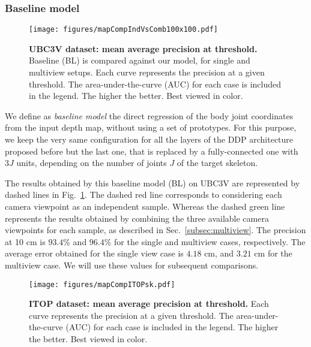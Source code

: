 \documentclass[review,12pt,3p]{elsarticle}
\begin{document}
\subsubsection{Baseline model}
%
\begin{figure}[t]
\centering
  \texttt{[image: figures/mapCompIndVsComb100x100.pdf]}
  \caption{\textbf{UBC3V dataset: mean average precision at threshold.} Baseline (BL) is compared against our model, for single and multiview setups. Each curve represents the precision at a given threshold. The area-under-the-curve (AUC) for each case is included in the legend. The higher the better. Best viewed in color.}
  \label{fig:singleVSmulti}
\end{figure}
%
We define as \textit{baseline model} the direct regression of the body joint coordinates from the input depth map, without using a set of prototypes. For this purpose, we keep the very same configuration for all the layers of the DDP architecture proposed before but the last one, that is replaced by a fully-connected one with $3J$ units, depending on the number of joints $J$ of the target skeleton.

The results obtained by this baseline model (BL) on UBC3V are represented by dashed lines in Fig.~\ref{fig:singleVSmulti}. The dashed red line corresponds to considering each camera viewpoint as an independent sample. Whereas the dashed green line represents the results obtained by combining the three available camera viewpoints for each sample, as described in Sec.~\ref{subsec:multiview}.
The precision at 10 cm is $93.4$\% and $96.4$\% for the single and multiview cases, respectively.
The average error obtained for the single view case is $4.18$ cm, and $3.21$ cm for the multiview case. 
We will use these values for subsequent comparisons.

\begin{figure}[t]
\centering
  \texttt{[image: figures/mapCompITOPsk.pdf]}
  \caption{\textbf{ITOP dataset: mean average precision at threshold.} Each curve represents the precision at a given threshold. The area-under-the-curve (AUC) for each case is included in the legend. The higher the better. Best viewed in color.}
  \label{fig:curveITOP}
\end{figure}
\end{document}
